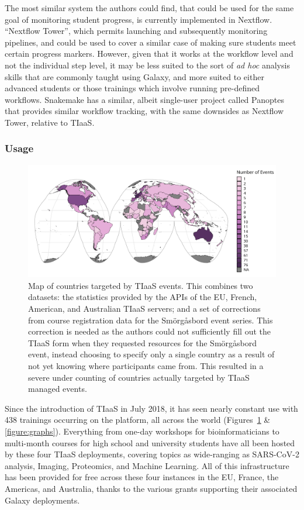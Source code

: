 \documentclass[a4paper,num-refs]{oup-contemporary}
\begin{document}
The most similar system the authors could find, that could be used for the same goal of monitoring student progress, is currently implemented in Nextflow. ``Nextflow Tower''\cite{nf-tower}, which permits launching and subsequently monitoring pipelines, and could be used to cover a similar case of making sure students meet certain progress markers. However, given that it works at the workflow level and not the individual step level, it may be less suited to the sort of \textit{ad hoc} analysis skills that are commonly taught using Galaxy, and more suited to either advanced students or those trainings which involve running pre-defined workflows. Snakemake has a similar, albeit single-user project called Panoptes that provides similar workflow tracking\cite{panoptes}, with the same downsides as Nextflow Tower, relative to TIaaS.

\subsubsection{Usage}

\begin{figure}[bt!]
\centering
	\includegraphics[width=\linewidth]{images/map.png}
	\caption{Map of countries targeted by TIaaS events. This combines two datasets: the statistics provided by the APIs of the EU, French, American, and Australian TIaaS servers; and a set of corrections from course registration data for the Smörgåsbord event series. This correction is needed as the authors could not sufficiently fill out the TIaaS form when they requested resources for the Smörgåsbord event, instead choosing to specify only a single country as a result of not yet knowing where participants came from. This resulted in a severe under counting of countries actually targeted by TIaaS managed events.}\label{figure:map}
\end{figure}

Since the introduction of TIaaS in July 2018, it has seen nearly constant use with 438 trainings occurring on the platform, all across the world (Figures~\ref{figure:map} \& \ref{figure:graphs}).
Everything from one-day workshops for bioinformaticians to multi-month courses for high school and university students have all been hosted by these four TIaaS deployments, covering topics as wide-ranging as SARS-CoV-2 analysis, Imaging, Proteomics, and Machine Learning. All of this infrastructure has been provided for free across these four instances in the EU, France, the Americas, and Australia, thanks to the various grants supporting their associated Galaxy deployments.
\end{document}
